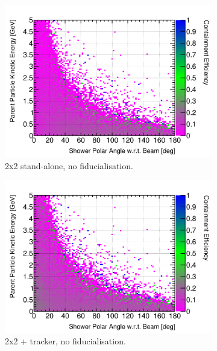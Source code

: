 \documentclass[10pt,a4paper,openany]{article}
\begin{document}
\begin{figure}[htbp]
	\centering
	\begin{subfigure}[b]{0.49\textwidth}
		\centering
		\includegraphics[width=1.0\textwidth]{Pi0_cont_eff_2x2.png}
		\caption{2x2 stand-alone, no fiducialisation.}
		\label{}
	\end{subfigure}	
	\hfill
	\begin{subfigure}[b]{0.49\textwidth}
		\centering
		\includegraphics[width=1.0\textwidth]{Pi0_cont_eff_2x2_Scintillator_gap.png}
		\caption{2x2 + tracker, no fiducialisation.}
		\label{}
	\end{subfigure}	
	\begin{subfigure}[b]{0.49\textwidth}
		\centering

\end{subfigure}
\end{figure}
\end{document}
